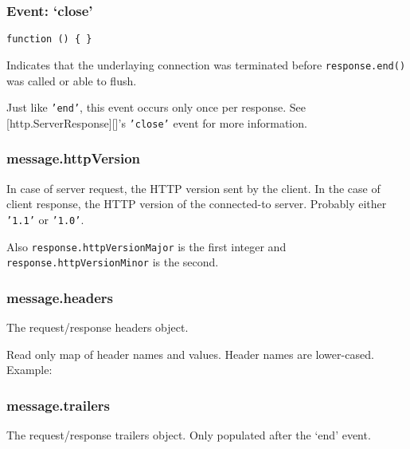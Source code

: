 \subsubsection{Event: `close'}

\texttt{function () \{ \}}

Indicates that the underlaying connection was terminated before
\texttt{response.end()} was called or able to flush.

Just like \texttt{'end'}, this event occurs only once per response. See
{[}http.ServerResponse{]}{[}{]}'s \texttt{'close'} event for more
information.

\subsubsection{message.httpVersion}

In case of server request, the HTTP version sent by the client. In the
case of client response, the HTTP version of the connected-to server.
Probably either \texttt{'1.1'} or \texttt{'1.0'}.

Also \texttt{response.httpVersionMajor} is the first integer and
\texttt{response.httpVersionMinor} is the second.

\subsubsection{message.headers}

The request/response headers object.

Read only map of header names and values. Header names are lower-cased.
Example:

\begin{Shaded}
\begin{Highlighting}[]
\CommentTok{//}
\NormalTok{(}\NormalTok{);}
\end{Highlighting}
\end{Shaded}

\subsubsection{message.trailers}

The request/response trailers object. Only populated after the `end'
event.

